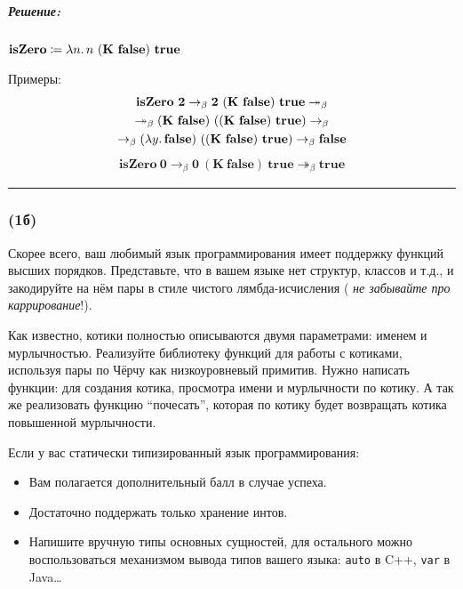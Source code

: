 \documentclass{article}
\newenvironment{proof}{\subparagraph{\hspace{-1em}Решение:\newline}\-}{\par\noindent\rule{\textwidth}{0.4pt}}
\newcommand{\comb}[1]{\mathbf{#1}}
\newcommand{\term}[1]{\mathbf{#1}}
\newcommand{\betastep}{\rightarrow_\beta}
\newcommand{\betasteps}{\twoheadrightarrow_\beta}
\renewcommand{\emph}[1]{{\color{blue} \textit{#1}}}
\begin{document}
    \begin{proof}
        \(\textbf{isZero} \coloneqq \lambda n\ldotp n~(\comb{K}~\term{false})~\term{true}\)

        Примеры:
        \begin{gather}
            \term{isZero}~\term{2} \betastep \term{2}~(\comb{K}~\term{false})~\term{true} \betasteps \\
            \betasteps (\comb{K}~\term{false})~((\comb{K}~\term{false})~\term{true}) \betastep \\
            \betastep (\lambda y\ldotp \term{false})~((\comb{K}~\term{false})~\term{true}) \betastep \term{false}
        \end{gather}
        \begin{gather}
            \term{isZero}~\term{0} \betastep \term{0}~(\comb{K}~\term{false})~\term{true} \betasteps \term{true}
        \end{gather}
    \end{proof}

    \subsubsection{(1б)}

    Скорее всего, ваш любимый язык программирования имеет поддержку функций высших порядков.
    Представьте, что в вашем языке нет структур, классов и т.д., и закодируйте на нём пары в стиле чистого лямбда-исчисления (\emph{не забывайте про каррирование}!).

    Как известно, котики полностью описываются двумя параметрами: именем и мурлычностью.
    Реализуйте библиотеку функций для работы с котиками, используя пары по Чёрчу как низкоуровневый примитив.
    Нужно написать функции: для создания котика, просмотра имени и мурлычности по котику.
    А так же реализовать функцию ``почесать'', которая по котику будет возвращать котика повышенной мурлычности.

    Если у вас статически типизированный язык программирования:
    \begin{itemize}
        \item Вам полагается дополнительный балл в случае успеха.
        \item Достаточно поддержать только хранение интов.
        \item Напишите вручную типы основных сущностей, для остального можно воспользоваться механизмом вывода типов вашего языка: \texttt{auto} в C++, \texttt{var} в Java\ldots
    \end{itemize}
\end{document}
